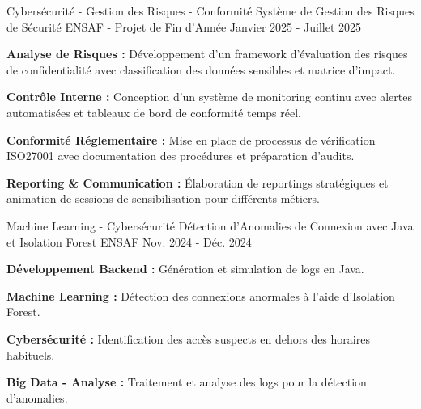 
\begin{cventries}

  \cventry
  {Cybersécurité - Gestion des Risques - Conformité}
  {Système de Gestion des Risques de Sécurité} %
  {ENSAF - Projet de Fin d'Année} %
  {Janvier 2025 - Juillet 2025} %
  {
    \begin{cvitems} %
      \item {
                  \textbf{Analyse de Risques :}
                  Développement d'un framework d'évaluation des risques de confidentialité avec classification des données sensibles et matrice d'impact.}
      \item {
                  \textbf{Contrôle Interne :}
                  Conception d'un système de monitoring continu avec alertes automatisées et tableaux de bord de conformité temps réel.}
      \item {
                  \textbf{Conformité Réglementaire :}
                  Mise en place de processus de vérification ISO27001 avec documentation des procédures et préparation d'audits.}
      \item {
                  \textbf{Reporting \& Communication :}
                  Élaboration de reportings stratégiques et animation de sessions de sensibilisation pour différents métiers.}
    \end{cvitems}
  }
\end{cventries}
\begin{cventries}
  \cventry
  {Machine Learning - Cybersécurité}
  {Détection d'Anomalies de Connexion avec Java et Isolation Forest} %
  {ENSAF} %
  {Nov. 2024 - Déc. 2024} %
  {
    \begin{cvitems} %
      \item {
                  \textbf{Développement Backend :}
                  Génération et simulation de logs en Java.}
      \item {
                  \textbf{Machine Learning :}
                  Détection des connexions anormales à l’aide d’Isolation Forest.}
      \item {
                  \textbf{Cybersécurité :}
                  Identification des accès suspects en dehors des horaires habituels.}
      \item {
                  \textbf{Big Data - Analyse :}
                  Traitement et analyse des logs pour la détection d’anomalies.}
    \end{cvitems}
  }
\end{cventries}
